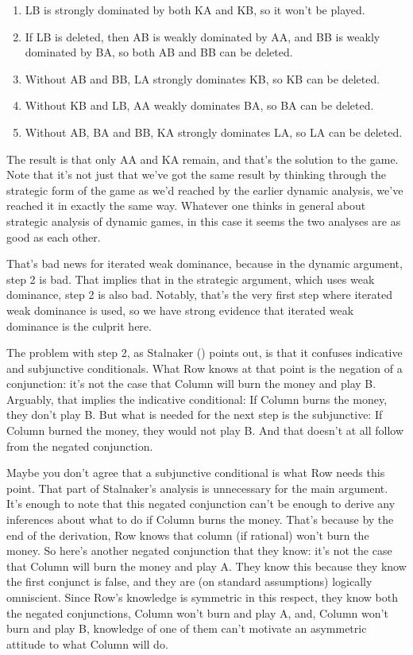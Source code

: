 \documentclass[
  12pt,
  letterpaper,
  DIV=11,
  numbers=noendperiod]{scrreprt}
\providecommand{\tightlist}{%
  \setlength{\itemsep}{0pt}\setlength{\parskip}{0pt}}\usepackage{longtable,booktabs,array}
\begin{document}
\begin{enumerate}
\def\labelenumi{\arabic{enumi}.}
\tightlist
\item
  LB is strongly dominated by both KA and KB, so it won't be played.
\item
  If LB is deleted, then AB is weakly dominated by AA, and BB is weakly
  dominated by BA, so both AB and BB can be deleted.
\item
  Without AB and BB, LA strongly dominates KB, so KB can be deleted.
\item
  Without KB and LB, AA weakly dominates BA, so BA can be deleted.
\item
  Without AB, BA and BB, KA strongly dominates LA, so LA can be deleted.
\end{enumerate}

The result is that only AA and KA remain, and that's the solution to the
game. Note that it's not just that we've got the same result by thinking
through the strategic form of the game as we'd reached by the earlier
dynamic analysis, we've reached it in exactly the same way. Whatever one
thinks in general about strategic analysis of dynamic games, in this
case it seems the two analyses are as good as each other.

That's bad news for iterated weak dominance, because in the dynamic
argument, step 2 is bad. That implies that in the strategic argument,
which uses weak dominance, step 2 is also bad. Notably, that's the very
first step where iterated weak dominance is used, so we have strong
evidence that iterated weak dominance is the culprit here.

The problem with step 2, as Stalnaker
() points out, is that it confuses
indicative and subjunctive conditionals. What Row knows at that point is
the negation of a conjunction: it's not the case that Column will burn
the money and play B. Arguably, that implies the indicative conditional:
If Column burns the money, they don't play B. But what is needed for the
next step is the subjunctive: If Column burned the money, they would not
play B. And that doesn't at all follow from the negated conjunction.

Maybe you don't agree that a subjunctive conditional is what Row needs
this point. That part of Stalnaker's analysis is unnecessary for the
main argument. It's enough to note that this negated conjunction can't
be enough to derive any inferences about what to do if Column burns the
money. That's because by the end of the derivation, Row knows that
column (if rational) won't burn the money. So here's another negated
conjunction that they know: it's not the case that Column will burn the
money and play A. They know this because they know the first conjunct is
false, and they are (on standard assumptions) logically omniscient.
Since Row's knowledge is symmetric in this respect, they know both the
negated conjunctions, Column won't burn and play A, and, Column won't
burn and play B, knowledge of one of them can't motivate an asymmetric
attitude to what Column will do.
\end{document}
